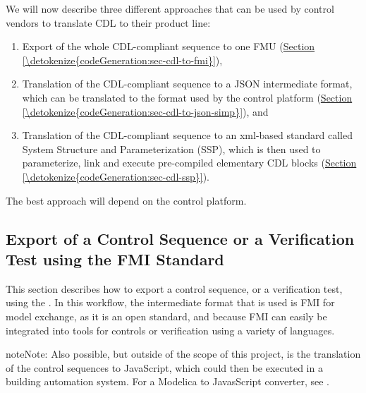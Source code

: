 \documentclass[letterpaper,10pt, openany,english]{sphinxmanual}
\begin{document}
We will now describe three different approaches that can be used by control vendors
to translate CDL to their product line:
\begin{enumerate}
\def\theenumi{\arabic{enumi}}
\def\labelenumi{\theenumi .}
\makeatletter\def\p@enumii{\p@enumi \theenumi .}\makeatother
\item {} 
Export of the whole CDL-compliant sequence to one FMU (\hyperref[\detokenize{codeGeneration:sec-cdl-to-fmi}]{Section \ref{\detokenize{codeGeneration:sec-cdl-to-fmi}}}),

\item {} 
Translation of the CDL-compliant sequence to a JSON intermediate format, which can be translated
to the format used by the control platform (\hyperref[\detokenize{codeGeneration:sec-cdl-to-json-simp}]{Section \ref{\detokenize{codeGeneration:sec-cdl-to-json-simp}}}), and

\item {} 
Translation of the CDL-compliant sequence to an xml-based standard called
System Structure and Parameterization (SSP), which
is then used to parameterize, link and execute pre-compiled elementary CDL blocks
(\hyperref[\detokenize{codeGeneration:sec-cdl-ssp}]{Section \ref{\detokenize{codeGeneration:sec-cdl-ssp}}}).

\end{enumerate}

The best approach will depend on the control platform.


\subsection{Export of a Control Sequence or a Verification Test using the FMI Standard}
\label{\detokenize{codeGeneration:export-of-a-control-sequence-or-a-verification-test-using-the-fmi-standard}}\label{\detokenize{codeGeneration:sec-cdl-to-fmi}}
This section describes how to export a control sequence, or a verification test,
using the {\hyperref[\detokenize{glossary:term-functional-mockup-interface}]{}}.
In this workflow, the intermediate format
that is used is FMI for model exchange, as it is an open standard, and because FMI
can easily be integrated into tools for controls or verification
using a variety of languages.

\begin{sphinxadmonition}{note}{Note:}
Also possible, but outside of the scope
of this project, is the translation of the control sequences to
JavaScript, which could then be executed in a building automation system.
For a Modelica to JavasScript converter,
see .
\end{sphinxadmonition}
\end{document}
